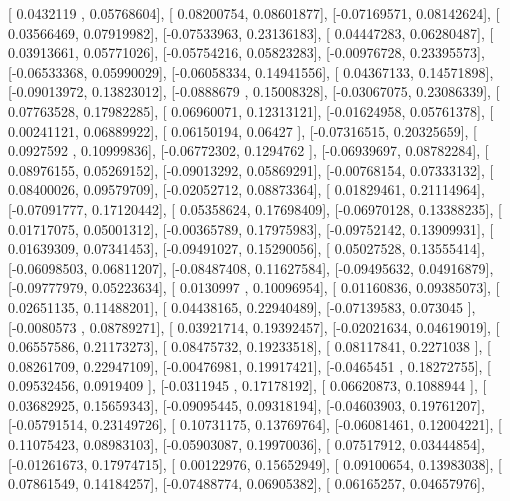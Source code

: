 \documentclass{article}
\begin{document}
       [ 0.0432119 ,  0.05768604],
       [ 0.08200754,  0.08601877],
       [-0.07169571,  0.08142624],
       [ 0.03566469,  0.07919982],
       [-0.07533963,  0.23136183],
       [ 0.04447283,  0.06280487],
       [ 0.03913661,  0.05771026],
       [-0.05754216,  0.05823283],
       [-0.00976728,  0.23395573],
       [-0.06533368,  0.05990029],
       [-0.06058334,  0.14941556],
       [ 0.04367133,  0.14571898],
       [-0.09013972,  0.13823012],
       [-0.0888679 ,  0.15008328],
       [-0.03067075,  0.23086339],
       [ 0.07763528,  0.17982285],
       [ 0.06960071,  0.12313121],
       [-0.01624958,  0.05761378],
       [ 0.00241121,  0.06889922],
       [ 0.06150194,  0.06427   ],
       [-0.07316515,  0.20325659],
       [ 0.0927592 ,  0.10999836],
       [-0.06772302,  0.1294762 ],
       [-0.06939697,  0.08782284],
       [ 0.08976155,  0.05269152],
       [-0.09013292,  0.05869291],
       [-0.00768154,  0.07333132],
       [ 0.08400026,  0.09579709],
       [-0.02052712,  0.08873364],
       [ 0.01829461,  0.21114964],
       [-0.07091777,  0.17120442],
       [ 0.05358624,  0.17698409],
       [-0.06970128,  0.13388235],
       [ 0.01717075,  0.05001312],
       [-0.00365789,  0.17975983],
       [-0.09752142,  0.13909931],
       [ 0.01639309,  0.07341453],
       [-0.09491027,  0.15290056],
       [ 0.05027528,  0.13555414],
       [-0.06098503,  0.06811207],
       [-0.08487408,  0.11627584],
       [-0.09495632,  0.04916879],
       [-0.09777979,  0.05223634],
       [ 0.0130997 ,  0.10096954],
       [ 0.01160836,  0.09385073],
       [ 0.02651135,  0.11488201],
       [ 0.04438165,  0.22940489],
       [-0.07139583,  0.073045  ],
       [-0.0080573 ,  0.08789271],
       [ 0.03921714,  0.19392457],
       [-0.02021634,  0.04619019],
       [ 0.06557586,  0.21173273],
       [ 0.08475732,  0.19233518],
       [ 0.08117841,  0.2271038 ],
       [ 0.08261709,  0.22947109],
       [-0.00476981,  0.19917421],
       [-0.0465451 ,  0.18272755],
       [ 0.09532456,  0.0919409 ],
       [-0.0311945 ,  0.17178192],
       [ 0.06620873,  0.1088944 ],
       [ 0.03682925,  0.15659343],
       [-0.09095445,  0.09318194],
       [-0.04603903,  0.19761207],
       [-0.05791514,  0.23149726],
       [ 0.10731175,  0.13769764],
       [-0.06081461,  0.12004221],
       [ 0.11075423,  0.08983103],
       [-0.05903087,  0.19970036],
       [ 0.07517912,  0.03444854],
       [-0.01261673,  0.17974715],
       [ 0.00122976,  0.15652949],
       [ 0.09100654,  0.13983038],
       [ 0.07861549,  0.14184257],
       [-0.07488774,  0.06905382],
       [ 0.06165257,  0.04657976],
\end{document}
